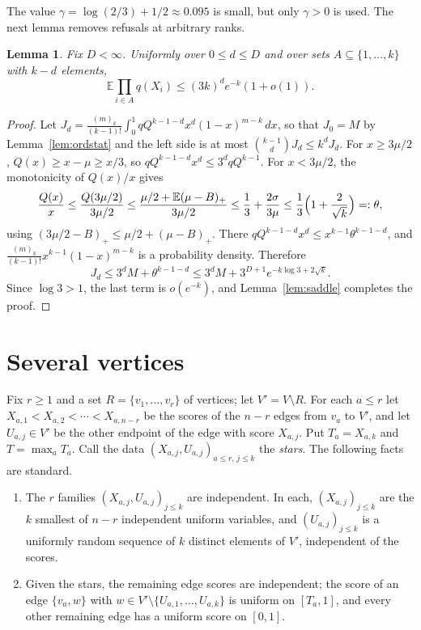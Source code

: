 \documentclass[11pt]{amsart}
\newtheorem{lemma}[theorem]{Lemma}
\theoremstyle{remark}
\numberwithin{equation}{section}
\newcommand{\E}{\mathbb E}
\newcommand{\1}{\mathbf 1}
\begin{document}
The value $\gamma=\log(2/3)+1/2\approx0.095$ is small, but only $\gamma>0$ is used. The next lemma removes refusals at arbitrary ranks.

\begin{lemma}\label{lem:omit}
Fix $D<\infty$. Uniformly over $0\le d\le D$ and over sets $A\subseteq\{1,\dots,k\}$ with $k-d$ elements,
\[
\E\prod_{i\in A}q(X_i)\le(3k)^de^{-k}(1+o(1)).
\]
\end{lemma}

\begin{proof}
Let $J_d=\frac{(m)_k}{(k-1)!}\int_0^1qQ^{k-1-d}x^d(1-x)^{m-k}\,dx$, so that $J_0=M$ by Lemma~\ref{lem:ordstat} and the left side is at most $\binom{k-1}dJ_d\le k^dJ_d$. For $x\ge3\mu/2$, $Q(x)\ge x-\mu\ge x/3$, so $qQ^{k-1-d}x^d\le3^dqQ^{k-1}$. For $x<3\mu/2$, the monotonicity of $Q(x)/x$ gives
\[
\frac{Q(x)}x\le\frac{Q(3\mu/2)}{3\mu/2}\le\frac{\mu/2+\E(\mu-B)_+}{3\mu/2}\le\frac13+\frac{2\sigma}{3\mu}\le\frac13\Bigl(1+\frac2{\sqrt k}\Bigr)=:\theta ,
\]
using $(3\mu/2-B)_+\le\mu/2+(\mu-B)_+$. There $qQ^{k-1-d}x^d\le x^{k-1}\theta^{k-1-d}$, and $\frac{(m)_k}{(k-1)!}x^{k-1}(1-x)^{m-k}$ is a probability density. Therefore
\[
J_d\le3^dM+\theta^{k-1-d}\le3^dM+3^{D+1}e^{-k\log3+2\sqrt k}.
\]
Since $\log3>1$, the last term is $o(e^{-k})$, and Lemma~\ref{lem:saddle} completes the proof.
\end{proof}

\section{Several vertices}\label{sec:several}

Fix $r\ge1$ and a set $R=\{v_1,\dots,v_r\}$ of vertices; let $V'=V\setminus R$. For each $a\le r$ let $X_{a,1}<X_{a,2}<\cdots<X_{a,n-r}$ be the scores of the $n-r$ edges from $v_a$ to $V'$, and let $U_{a,j}\in V'$ be the other endpoint of the edge with score $X_{a,j}$. Put $T_a=X_{a,k}$ and $T=\max_aT_a$. Call the data $(X_{a,j},U_{a,j})_{a\le r,\,j\le k}$ the \emph{stars}. The following facts are standard.
\begin{enumerate}[label=(F\arabic*),leftmargin=*]
\item The $r$ families $(X_{a,j},U_{a,j})_{j\le k}$ are independent. In each, $(X_{a,j})_{j\le k}$ are the $k$ smallest of $n-r$ independent uniform variables, and $(U_{a,j})_{j\le k}$ is a uniformly random sequence of $k$ distinct elements of $V'$, independent of the scores.
\item Given the stars, the remaining edge scores are independent; the score of an edge $\{v_a,w\}$ with $w\in V'\setminus\{U_{a,1},\dots,U_{a,k}\}$ is uniform on $[T_a,1]$, and every other remaining edge has a uniform score on $[0,1]$.
\end{enumerate}
\end{document}
